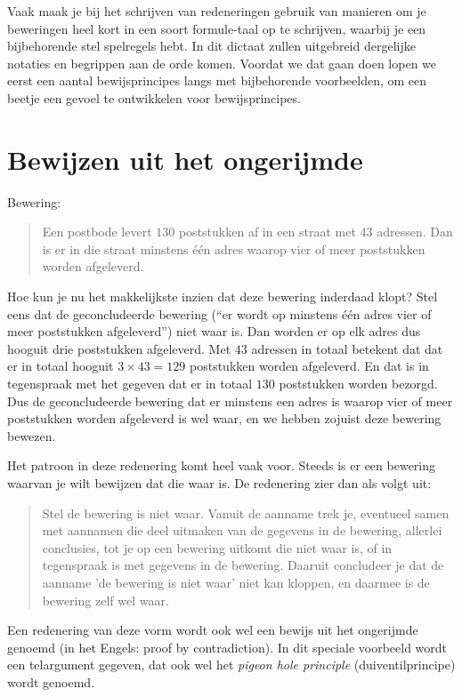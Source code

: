 Vaak maak je bij het schrijven van redeneringen gebruik van manieren om je beweringen heel kort in een soort formule-taal op te schrijven, waarbij je een bijbehorende stel spelregels hebt. In dit dictaat zullen uitgebreid dergelijke notaties en begrippen aan de orde komen. Voordat we dat gaan doen lopen we eerst een aantal bewijsprincipes langs met bijbehorende voorbeelden, om een beetje een gevoel te ontwikkelen voor bewijsprincipes.

\section{Bewijzen uit het ongerijmde}\label{sec:pbc}
Bewering:
\begin{quote}
Een postbode levert $130$ poststukken af in een straat met $43$ adressen. Dan is er in die straat minstens \'e\'en adres waarop vier of meer poststukken worden afgeleverd.
\end{quote}
Hoe kun je nu het makkelijkste inzien dat deze bewering inderdaad klopt? Stel eens dat de geconcludeerde bewering (``er wordt op minstens \'e\'en adres vier of meer poststukken afgeleverd'') niet waar is. Dan worden er op elk adres dus hooguit drie poststukken afgeleverd. Met $43$ adressen in totaal betekent dat dat er in totaal hooguit $3\times 43=129$ poststukken worden afgeleverd. En dat is in tegenspraak met het gegeven dat er in totaal $130$ poststukken worden bezorgd. Dus de geconcludeerde bewering dat er minstens een adres is waarop vier of meer poststukken worden afgeleverd is wel waar, en we hebben zojuist deze bewering bewezen.

Het patroon in deze redenering komt heel vaak voor. Steeds is er een bewering waarvan je wilt bewijzen dat die waar is. De redenering zier dan als volgt uit:
\begin{quote}
Stel de bewering is niet waar. Vanuit de aanname trek je, eventueel samen met aannamen die deel uitmaken van de gegevens in de bewering, allerlei conclusies, tot je op een bewering uitkomt die niet waar is, of in tegenspraak is met gegevens in de bewering. Daaruit concludeer je dat de aanname 'de bewering is niet waar' niet kan kloppen, en daarmee is de bewering zelf wel waar.
\end{quote}

Een redenering van deze vorm wordt ook wel een bewijs uit het ongerijmde genoemd (in het Engels: proof by contradiction). In dit speciale voorbeeld wordt een telargument gegeven, dat ook wel het \textit{pigeon hole principle} (duiventilprincipe) wordt genoemd.

